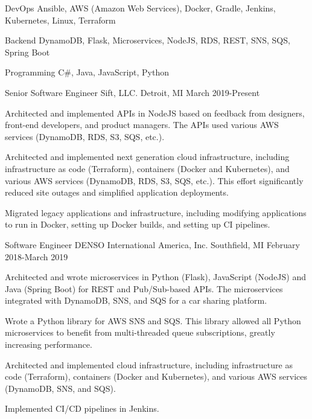 \documentclass[11pt, a4paper]{awesome-cv}
\begin{document}
\makecvheader[C]


\begin{cvskills}
    \cvskill
    {DevOps}
    {Ansible, AWS (Amazon Web Services), Docker, Gradle, Jenkins, Kubernetes, Linux, Terraform}

    \cvskill
    {Backend}
    {DynamoDB, Flask, Microservices, NodeJS, RDS, REST, SNS, SQS, Spring Boot}

    \cvskill
    {Programming}
    {C\#, Java, JavaScript, Python}
\end{cvskills}

\begin{cventries}
    \cventry
    {Senior Software Engineer}
    {Sift, LLC.}
    {Detroit, MI}
    {March 2019-Present}
    {
        \begin{cvitems}
            \item{Architected and implemented APIs in NodeJS based on feedback from designers, front-end developers, and product managers. The APIs used various AWS services (DynamoDB, RDS, S3, SQS, etc.).}
            \item{Architected and implemented next generation cloud infrastructure, including infrastructure as code (Terraform), containers (Docker and Kubernetes), and various AWS services (DynamoDB, RDS, S3, SQS, etc.). This effort significantly reduced site outages and simplified application deployments.}
            \item{Migrated legacy applications and infrastructure, including modifying applications to run in Docker, setting up Docker builds, and setting up CI pipelines.}
        \end{cvitems}
    }

    \cventry
    {Software Engineer}
    {DENSO International America, Inc.}
    {Southfield, MI}
    {February 2018-March 2019}
    {
        \begin{cvitems}
            \item{Architected and wrote microservices in Python (Flask), JavaScript (NodeJS) and Java (Spring Boot) for REST and Pub/Sub-based APIs. The microservices integrated with DynamoDB, SNS, and SQS for a car sharing platform.}
            \item{Wrote a Python library for AWS SNS and SQS. This library allowed all Python microservices to benefit from multi-threaded queue subscriptions, greatly increasing performance.}
            \item{Architected and implemented cloud infrastructure, including infrastructure as code (Terraform), containers (Docker and Kubernetes), and various AWS services (DynamoDB, SNS, and SQS).}
            \item{Implemented CI/CD pipelines in Jenkins.}
        \end{cvitems}
    }


\end{cventries}
\end{document}
